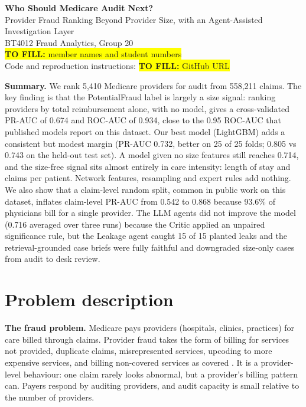 \documentclass[11pt,a4paper]{article}
\newcommand{\todo}[1]{\colorbox{yellow}{\textbf{TO FILL:} #1}}
\begin{document}
\begin{center}
{\LARGE\bfseries Who Should Medicare Audit Next?}\\[3pt]
{\large Provider Fraud Ranking Beyond Provider Size, with an Agent-Assisted Investigation Layer}\\[8pt]
BT4012 Fraud Analytics, Group 20\\
\todo{member names and student numbers}\\[3pt]
Code and reproduction instructions: \todo{GitHub URL}
\end{center}

\noindent\textbf{Summary.} We rank 5,410 Medicare providers for audit from 558,211 claims. The key finding is that the PotentialFraud label is largely a size signal: ranking providers by total reimbursement alone, with no model, gives a cross-validated PR-AUC of 0.674 and ROC-AUC of 0.934, close to the 0.95 ROC-AUC that published models report on this dataset. Our best model (LightGBM) adds a consistent but modest margin (PR-AUC 0.732, better on 25 of 25 folds; 0.805 vs 0.743 on the held-out test set). A model given no size features still reaches 0.714, and the size-free signal sits almost entirely in care intensity: length of stay and claims per patient. Network features, resampling and expert rules add nothing. We also show that a claim-level random split, common in public work on this dataset, inflates claim-level PR-AUC from 0.542 to 0.868 because 93.6\% of physicians bill for a single provider. The LLM agents did not improve the model (0.716 averaged over three runs) because the Critic applied an unpaired significance rule, but the Leakage agent caught 15 of 15 planted leaks and the retrieval-grounded case briefs were fully faithful and downgraded size-only cases from audit to desk review.

\section{Problem description}

\textbf{The fraud problem.} Medicare pays providers (hospitals, clinics, practices) for care billed through claims. Provider fraud takes the form of billing for services not provided, duplicate claims, misrepresented services, upcoding to more expensive services, and billing non-covered services as covered \cite{kaggle}. It is a provider-level behaviour: one claim rarely looks abnormal, but a provider's billing pattern can. Payers respond by auditing providers, and audit capacity is small relative to the number of providers.
\end{document}
